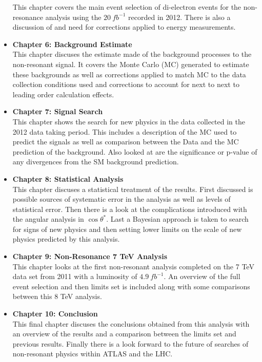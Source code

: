 \begin{itemize}
{This chapter covers the main event selection of di-electron events for the non-resonance analysis using the $20~fb^{-1}$ recorded in 2012. There is also a discussion of and need for corrections applied to energy measurements.
}
\item{ 
{\bf Chapter 6: Background Estimate} \\
This chapter discuses the estimate made of the background processes to the non-resonant signal. It covers the Monte Carlo (MC) generated to estimate these backgrounds as well as corrections applied to match MC to the data collection conditions used and corrections to account for next to next to leading order calculation effects.
}
\item{ 
{\bf Chapter 7: Signal Search} \\
This chapter shows the search for new physics in the data collected in the 2012 data taking period. This includes a description of the MC used to predict the signals as well as comparison between the Data and the MC prediction of the background. Also looked at are the significance or p-value of any divergences from the SM background prediction.
}
\item{ 
{\bf Chapter 8: Statistical Analysis} \\
This chapter discuses a statistical treatment of the results. First discussed is possible sources of systematic error in the analysis as well as levels of statistical error. Then there is a look at the complications introduced with the angular analysis in $\cos\theta^{*}$. Last a Bayesian approach is taken to search for signs of new physics and then setting lower limits on the scale of new physics predicted by this analysis.
}
\item{ 
{\bf Chapter 9: Non-Resonance 7 TeV Analysis} \\
This chapter looks at the first non-resonant analysis completed on the 7 TeV data set from 2011 with a luminosity of $4.9~fb^{-1}$. An overview of the full event selection and then limits set is included along with some comparisons between this 8 TeV analysis. 
}
\item{ 
{\bf Chapter 10: Conclusion} \\
This final chapter discuses the conclusions obtained from this analysis with an overview of the results and a comparison between the limits set and previous results. Finally there is a look forward to the future of searches of non-resonant physics within ATLAS and the LHC.
}
\end{itemize}






